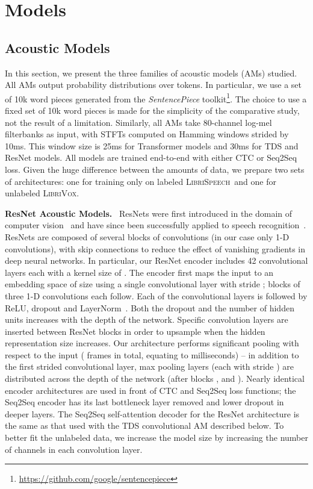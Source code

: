 \documentclass{article}
\newcommand{\librivox}{\textsc{LibriVox}}
\newcommand{\librispeech}{\textsc{LibriSpeech}}
\begin{document}
\section{Models}
\label{sec:models}
\subsection{Acoustic Models}
\label{sec:acousticmodels}
In this section, we present the three families of acoustic models (AMs) studied. All AMs output probability distributions over tokens. In particular, we use a set of 10k word pieces \cite{schuster2012wpm,kudo2018sentencepiece} generated from the \textit{SentencePiece} toolkit\footnote{\url{https://github.com/google/sentencepiece}}. The choice to use a fixed set of 10k word pieces is made for the simplicity of the comparative study, not the result of a limitation. Similarly, all AMs take 80-channel log-mel filterbanks as input, with STFTs computed on Hamming windows strided by 10ms. This window size is 25ms for Transformer models and 30ms for TDS and ResNet models. All models are trained end-to-end with either CTC or Seq2Seq loss. Given the huge difference between the amounts of data, we prepare two sets of architectures: one for training only on labeled \librispeech~and one for unlabeled \librivox. 

\textbf{ResNet Acoustic Models.}~
\label{sec:resnet}
ResNets were first introduced in the domain of computer vision~\cite{he2016resnets} and have since been successfully applied to speech recognition~\cite{xion2017,saon2017,li2019jasper,wang2017residual}. ResNets are composed of several blocks of convolutions (in our case only 1-D convolutions), with skip connections to reduce the effect of vanishing gradients in deep neural networks. In particular, our ResNet encoder includes 42 convolutional layers each with a kernel size of . The encoder first maps the input to an embedding space of size  using a single convolutional layer with stride ;  blocks of three 1-D convolutions each follow. Each of the convolutional layers is followed by ReLU, dropout and LayerNorm~\cite{ba2016layer}. Both the dropout and the number of hidden units increases with the depth of the network. Specific convolution layers are inserted between ResNet blocks in order to upsample when the hidden representation size increases. Our architecture performs significant pooling with respect to the input ( frames in total, equating to  milliseconds) -- in addition to the first strided convolutional layer,  max pooling layers (each with stride ) are distributed across the depth of the network (after blocks ,  and ). Nearly identical encoder architectures are used in front of CTC and Seq2Seq loss functions; the Seq2Seq encoder has its last bottleneck layer removed and lower dropout in deeper layers. The Seq2Seq self-attention decoder for the ResNet architecture is the same as that used with the TDS convolutional AM described below. To better fit the unlabeled data, we increase the model size by increasing the number of channels in each convolution layer. 
\end{document}
